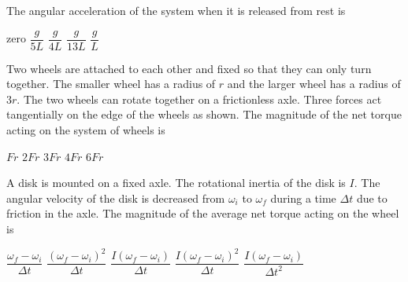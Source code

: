\documentclass{../../oss-classkick-exam}
\begin{document}
\begin{multicols*}{2}
\begin{questions}
    \question The angular acceleration of the system when it is released from
    rest is
    \label{lightrod2}
    \begin{choices}
      \choice zero
      \choice $\dfrac{g}{5L}$
      \choice $\dfrac{g}{4L}$
      \choice $\dfrac{g}{13L}$
      \choice $\dfrac{g}L$
    \end{choices}

    \question Two wheels are attached to each other and fixed so that they can
    only turn together. The smaller wheel has a radius of $r$ and the larger
    wheel has a radius of $3r$. The two wheels can rotate together on a
    frictionless axle. Three forces act tangentially on the edge of the wheels
    as shown. The magnitude of the net torque acting on the system of wheels is
    \begin{center}
    \end{center}
    \begin{choices}
      \choice $Fr$
      \choice $2Fr$
      \choice $3Fr$
      \choice $4Fr$
      \choice $6Fr$
    \end{choices}
    \columnbreak

    \question A disk is mounted on a fixed axle. The rotational inertia of the
    disk is $I$. The angular velocity of the disk is decreased from $\omega_i$
    to $\omega_f$ during a time $\Delta t$ due to friction in the axle. The
    magnitude of the average net torque acting on the wheel is
    \begin{choices}
      \choice $\dfrac{\omega_f-\omega_i}{\Delta t}$
      \choice $\dfrac{(\omega_f-\omega_i)^2}{\Delta t}$
      \choice $\dfrac{I(\omega_f-\omega_i)}{\Delta t}$
      \choice $\dfrac{I(\omega_f-\omega_i)^2}{\Delta t}$
      \choice $\dfrac{I(\omega_f-\omega_i)}{\Delta t^2}$
    \end{choices}
    \vspace{.7in}
    

\end{questions}
\end{multicols*}
\end{document}
